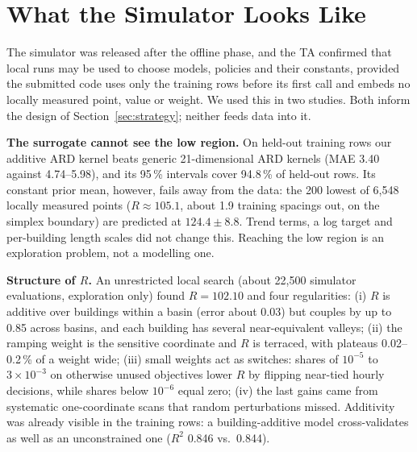 \section{What the Simulator Looks Like}
\label{sec:landscape}
The simulator was released after the offline phase, and the TA confirmed that local runs may be used to choose models,
policies and their constants, provided the submitted code uses only the training rows before its first call and embeds
no locally measured point, value or weight. We used this in two studies. Both inform the design of
Section~\ref{sec:strategy}; neither feeds data into it.

\textbf{The surrogate cannot see the low region.} On held-out training rows our additive ARD kernel beats generic
21-dimensional ARD kernels (MAE 3.40 against 4.74--5.98), and its 95\,\% intervals cover 94.8\,\% of held-out rows. Its
constant prior mean, however, fails away from the data: the 200 lowest of 6,548 locally measured points ($R\approx105.1$,
about 1.9 training spacings out, on the simplex boundary) are predicted at $124.4\pm8.8$. Trend terms, a log target and
per-building length scales did not change this. Reaching the low region is an exploration problem, not a modelling one.

\textbf{Structure of $R$.} An unrestricted local search (about 22,500 simulator evaluations, exploration only) found
$R=102.10$ and four regularities: (i) $R$ is additive over buildings within a basin (error about 0.03) but couples by up
to 0.85 across basins, and each building has several near-equivalent valleys; (ii) the ramping weight is the sensitive
coordinate and $R$ is terraced, with plateaus 0.02--0.2\,\% of a weight wide; (iii) small weights act as switches:
shares of $10^{-5}$ to $3\times10^{-3}$ on otherwise unused objectives lower $R$ by flipping near-tied hourly decisions,
while shares below $10^{-6}$ equal zero; (iv) the last gains came from systematic one-coordinate scans that random
perturbations missed. Additivity was already visible in the training rows: a building-additive model cross-validates as
well as an unconstrained one ($R^2$ 0.846 vs.\ 0.844).
